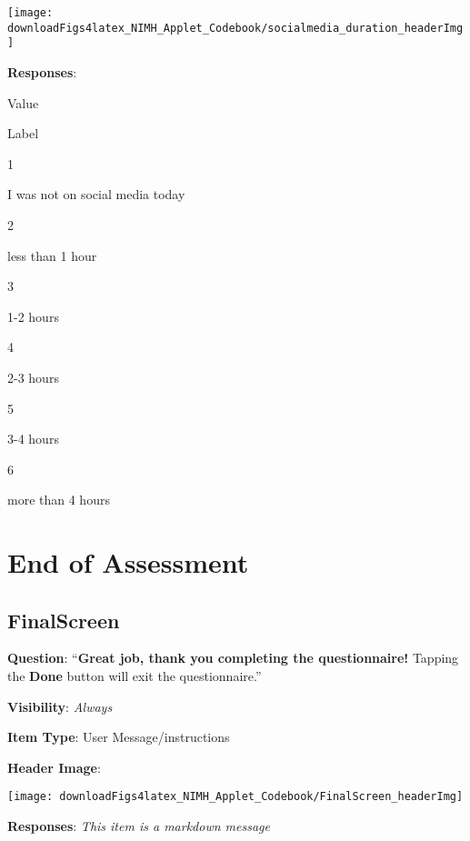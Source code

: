 \documentclass[]{book}
\begin{document}
\begin{flushleft}\texttt{[image: downloadFigs4latex\_NIMH\_Applet\_Codebook/socialmedia\_duration\_headerImg]} \end{flushleft}

\textbf{Responses}:

Value

Label

1

I was not on social media today

2

less than 1 hour

3

1-2 hours

4

2-3 hours

5

3-4 hours

6

more than 4 hours

\hypertarget{end_section}{%
\chapter{End of Assessment}\label{end_section}}

\hypertarget{finalscreen}{%
\section{FinalScreen}\label{finalscreen}}

\textbf{Question}: ``\textbf{Great job, thank you completing the questionnaire!} Tapping the \textbf{Done} button will exit the questionnaire.''

\textbf{Visibility}: \emph{Always}

\textbf{Item Type}: User Message/instructions

\textbf{Header Image}:

\begin{flushleft}\texttt{[image: downloadFigs4latex\_NIMH\_Applet\_Codebook/FinalScreen\_headerImg]} \end{flushleft}

\textbf{Responses}: \emph{This item is a markdown message}


\end{document}
